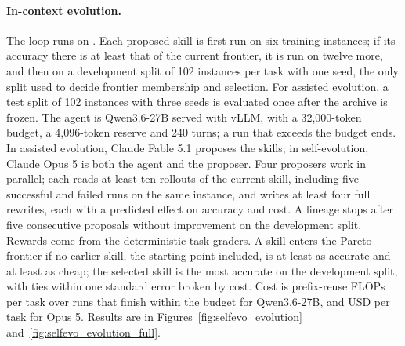 \paragraph{In-context evolution.}
The loop runs on \ourbench{}. Each proposed skill is first run on six training instances; if its accuracy there is at least that of the current frontier, it is run on twelve more, and then on a development split of 102 instances per task with one seed, the only split used to decide frontier membership and selection. For assisted evolution, a test split of 102 instances with three seeds is evaluated once after the archive is frozen. The agent is Qwen3.6-27B served with vLLM, with a 32{,}000-token budget, a 4{,}096-token reserve and 240 turns; a run that exceeds the budget ends. In assisted evolution, Claude Fable 5.1 proposes the skills; in self-evolution, Claude Opus 5 is both the agent and the proposer. Four proposers work in parallel; each reads at least ten rollouts of the current skill, including five successful and failed runs on the same instance, and writes at least four full rewrites, each with a predicted effect on accuracy and cost. A lineage stops after five consecutive proposals without improvement on the development split. Rewards come from the deterministic task graders. A skill enters the Pareto frontier if no earlier skill, the starting point included, is at least as accurate and at least as cheap; the selected skill is the most accurate on the development split, with ties within one standard error broken by cost. Cost is prefix-reuse FLOPs per task over runs that finish within the budget for Qwen3.6-27B, and USD per task for Opus 5. Results are in Figures~\ref{fig:selfevo_evolution} and~\ref{fig:selfevo_evolution_full}.

